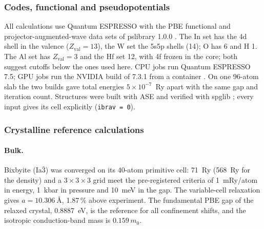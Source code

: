 \subsubsection{Codes, functional and pseudopotentials}
\label{sec:m-dft-codes}

All calculations use Quantum ESPRESSO \citep{Giannozzi2009,Giannozzi2017} with the PBE functional \citep{Perdew1996}
and projector-augmented-wave data sets of pslibrary 1.0.0 \citep{Bloechl1994,DalCorso2014}. The In set has the 4d
shell in the valence ($Z_{\mathrm{val}} = 13$), the W set the 5s5p shells (14); O has 6 and H 1. %
The Al set has $Z_{\mathrm{val}} = 3$ and the Hf set 12, with 4f frozen in the core; both suggest cutoffs below the ones
used here. %
CPU jobs run Quantum ESPRESSO 7.5; GPU jobs run the NVIDIA build of 7.3.1 from a container
\citep{NvidiaQE,Kurtzer2017}. %
On one 96-atom slab the two builds gave total energies $5\times10^{-7}$~Ry apart with the same gap and iteration count. %
Structures were built with ASE \citep{Larsen2017} and verified with spglib \citep{Togo2018}; every input gives its
cell explicitly (\texttt{ibrav = 0}). %

\subsubsection{Crystalline reference calculations}
\label{sec:m-dft-crystal}

\paragraph{Bulk.} Bixbyite \InO{} (Ia$\bar3$) \citep{Marezio1966} was converged on its 40-atom primitive cell:
71~Ry (568~Ry for the density) and a $3\times3\times3$ grid meet the pre-registered criteria of 1~mRy/atom in energy,
1~kbar in pressure and 10~meV in the gap. %
The variable-cell relaxation gives $a = \SI{10.306}{\angstrom}$, 1.87\,\% above experiment. %
The fundamental PBE gap of the relaxed crystal, 0.8887~eV, is the reference for all confinement shifts, and the
isotropic conduction-band mass is $0.159\,m_0$. %


